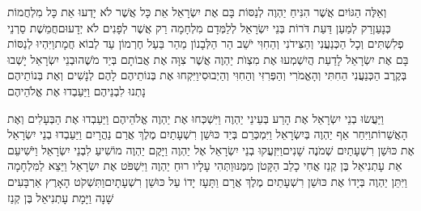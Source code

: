 \documentclass[../main/main.tex]{subfiles}
\begin{document}
\begin{multicols*}{\ncols}
וְאֵלֶּה הַגּוֹיִם אֲשֶׁר הִנִּיחַ יַהְוֶה לְנַסּוֹת בָּם אֶת יִשְׂרָאֵל אֵת כָּל אֲשֶׁר לֹא יָדְעוּ אֵת כָּל מִלְחֲמוֹת כְּנָעַן\PreVerseSpace{}רַק לְמַעַן דַּעַת דֹּרוֹת בְּנֵי יִשְׂרָאֵל לְלַמְּדָם מִלְחָמָה רַק אֲשֶׁר לְפָנִים לֹא יְדָעוּם\PreVerseSpace{}חֲמֵשֶׁת סַרְנֵי פְלִשְׁתִּים וְכָל הַכְּנַעֲנִי וְהַצִּידֹנִי וְהַחִוִּי יֹשֵׁב הַר הַלְּבָנוֹן מֵהַר בַּעַל חֶרְמוֹן עַד לְבוֹא חֲמָת\PreVerseSpace{}וַיִּהְיוּ לְנַסּוֹת בָּם אֶת יִשְׂרָאֵל לָדַעַת הֲיִשְׁמְעוּ אֶת מִצְוֺת יַהְוֶה אֲשֶׁר צִוָּה אֶת אֲבוֹתָם בְּיַד מֹשֶׁה\PreVerseSpace{}וּבְנֵי יִשְׂרָאֵל יָשְׁבוּ בְּקֶרֶב הַכְּנַעֲנִי הַחִתִּי וְהָאֱמֹרִי וְהַפְּרִזִּי וְהַחִוִּי וְהַיְבוּסִי\PreVerseSpace{}וַיִּקְחוּ אֶת בְּנוֹתֵיהֶם לָהֶם לְנָשִׁים וְאֶת בְּנוֹתֵיהֶם נָתְנוּ לִבְנֵיהֶם וַיַּעַבְדוּ אֶת אֱלֹהֵיהֶם\OpenSection{}\par
{}וַיַּעֲשׂוּ בְנֵי יִשְׂרָאֵל אֶת הָרַע בְּעֵינֵי יַהְוֶה וַיִּשְׁכְּחוּ אֶת יַהְוֶה אֱלֹהֵיהֶם וַיַּעַבְדוּ אֶת הַבְּעָלִים וְאֶת הָאֲשֵׁרוֹת\PreVerseSpace{}וַיִּחַר אַף יַהְוֶה בְּיִשְׂרָאֵל וַיִּמְכְּרֵם בְּיַד כּוּשַׁן רִשְׁעָתַיִם מֶלֶךְ אֲרַם נַהֲרָיִם וַיַּעַבְדוּ בְנֵי יִשְׂרָאֵל אֶת כּוּשַׁן רִשְׁעָתַיִם שְׁמֹנֶה שָׁנִים\PreVerseSpace{}וַיִּזְעֲקוּ בְנֵי יִשְׂרָאֵל אֶל יַהְוֶה וַיָּקֶם יַהְוֶה מוֹשִׁיעַ לִבְנֵי יִשְׂרָאֵל וַיֹּשִׁיעֵם אֵת עָתְנִיאֵל בֶּן קְנַז אֲחִי כָלֵב הַקָּטֹן מִמֶּנּוּ\PreVerseSpace{}וַתְּהִי עָלָיו רוּחַ יַהְוֶה וַיִּשְׁפֹּט אֶת יִשְׂרָאֵל וַיֵּצֵא לַמִּלְחָמָה וַיִּתֵּן יַהְוֶה בְּיָדוֹ אֶת כּוּשַׁן רִשְׁעָתַיִם מֶלֶךְ אֲרָם וַתָּעָז יָדוֹ עַל כּוּשַׁן רִשְׁעָתָיִם\PreVerseSpace{}וַתִּשְׁקֹט הָאָרֶץ אַרְבָּעִים שָׁנָה וַיָּמָת עָתְנִיאֵל בֶּן קְנַז\OpenSection{}\par

\end{multicols*}
\end{document}
